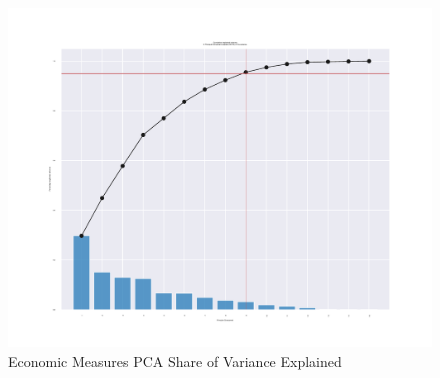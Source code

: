 \documentclass[12pt]{article}
\begin{document}
        \begin{figure}[h!]
            \centering
            \caption{Economic Measures PCA Share of Variance Explained}
            \label{Econ_Share_Explained}	
            \includegraphics[width=\linewidth,keepaspectratio=true]{../Output/Figures/Econ_Indicator_Share_Explained.pdf}
        \end{figure}
\end{document}
